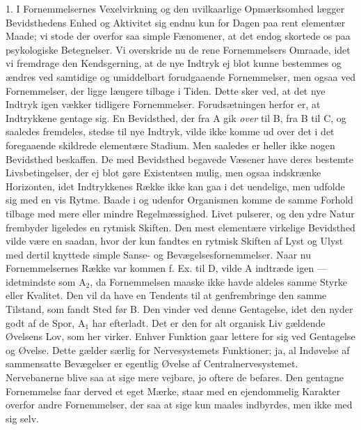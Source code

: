 \documentclass[12pt,a4paper,openany]{book}
\newcommand{\opage}[1]{\marginnote{\footnotesize\textit{[#1]}}}
\begin{document}
1. I Fornemmelsernes Vexelvirkning og den uvilkaarlige Opmærksomhed
lægger Bevidsthedens Enhed og Aktivitet sig endnu kun for Dagen paa rent
elementær Maade; vi stode der overfor saa simple Fænomener, at det endog
skortede os paa psykologiske Betegnelser. Vi overskride nu de rene
Fornemmelsers Omraade, idet vi fremdrage den Kendsgerning, at de nye
Indtryk ej blot kunne bestemmes og ændres ved samtidige og umiddelbart
forudgaaende Fornemmelser, men ogsaa ved Fornemmelser, der ligge længere
tilbage i Tiden. Dette sker ved, at det nye Indtryk igen vækker
tidligere Fornemmelser. Forudsætningen herfor er, at Indtrykkene gentage
sig. En Bevidsthed, der fra A gik \emph{over} til B, fra B til C, og
saaledes fremdeles, stedse til nye Indtryk, vilde ikke komme ud over det
i det foregaaende skildrede elementære Stadium. Men saaledes er heller
ikke nogen Bevidsthed beskaffen. De med Bevidsthed begavede Væsener have
deres bestemte Livsbetingelser, der ej blot gøre Existentsen mulig, men
ogsaa indskrænke Horizonten, idet Indtrykkenes Række ikke kan gaa i det
uendelige, men udfolde sig med en vis Rytme. Baade i og udenfor
Organismen komme de samme Forhold tilbage med mere eller mindre
Regelmæssighed. Livet pulserer, og den ydre Natur frembyder ligeledes en
rytmisk Skiften. Den mest elementære virkelige Bevidsthed vilde være en
saadan, hvor der kun fandtes en rytmisk Skiften af Lyst og Ulyst med
dertil knyttede simple Sanse- og Bevægelsesfornemmelser. Naar nu
Fornemmelsernes Række var kommen f. Ex. til D, vilde A indtræde igen ---
idetmindste som A$_{2}$, da Fornemmelsen maaske ikke havde aldeles samme
Styrke eller Kvalitet. Den vil da
\opage{151}have en Tendents til at genfrembringe den samme Tilstand, som
fandt Sted før B. Den vinder ved denne Gentagelse, idet den nyder godt
af de Spor, A$_{1}$ har efterladt. Det er den for alt organisk Liv
gældende Øvelsens Lov, som her virker. Enhver Funktion gaar lettere for
sig ved Gentagelse og Øvelse. Dette gælder særlig for Nervesystemets
Funktioner; ja, al Indøvelse af sammensatte Bevægelser er egentlig
Øvelse af Centralnervesystemet. Nervebanerne blive saa at sige mere
vejbare, jo oftere de befares. Den gentagne Fornemmelse faar derved et
eget Mærke, staar med en ejendommelig Karakter overfor andre
Fornemmelser, der saa at sige kun maales indbyrdes, men ikke med sig
selv.
\end{document}
